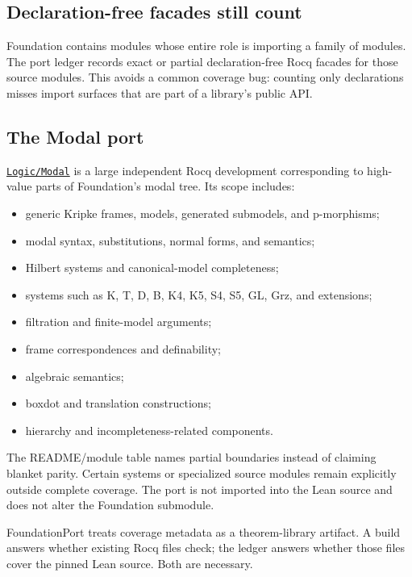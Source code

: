 \documentclass[
  10pt,
  a4paper,
  twoside,
  open=any,
  parskip=half,
  headings=big
]{scrreprt}
\newcommand{\CommitFull}{675d0a2ff0fc624fba199e006049016ba806f40a}
\newcommand{\RepoTreeBase}{https://github.com/VladimirReshetnikov/ProveIt/tree/\CommitFull/}
\newcommand{\RepoDir}[1]{%
  \href{\RepoTreeBase\detokenize{#1}}{\nolinkurl{#1}}}
\begin{document}
\subsection{Declaration-free facades still count}

Foundation contains modules whose entire role is importing a family of modules.
The port ledger records exact or partial declaration-free Rocq facades for
those source modules.  This avoids a common coverage bug: counting only
declarations misses import surfaces that are part of a library's public API.

\subsection{The Modal port}

\RepoDir{Logic/Modal} is a large independent Rocq development corresponding to
high-value parts of Foundation's modal tree.  Its scope includes:

\begin{itemize}
  \item generic Kripke frames, models, generated submodels, and p-morphisms;
  \item modal syntax, substitutions, normal forms, and semantics;
  \item Hilbert systems and canonical-model completeness;
  \item systems such as K, T, D, B, K4, K5, S4, S5, GL, Grz, and extensions;
  \item filtration and finite-model arguments;
  \item frame correspondences and definability;
  \item algebraic semantics;
  \item boxdot and translation constructions;
  \item hierarchy and incompleteness-related components.
\end{itemize}

The README/module table names partial boundaries instead of claiming blanket
parity.  Certain systems or specialized source modules remain explicitly
outside complete coverage.  The port is not imported into the Lean source and
does not alter the Foundation submodule.

\begin{overviewbox}
FoundationPort treats coverage metadata as a theorem-library artifact.  A
build answers whether existing Rocq files check; the ledger answers whether
those files cover the pinned Lean source.  Both are necessary.
\end{overviewbox}
\end{document}
